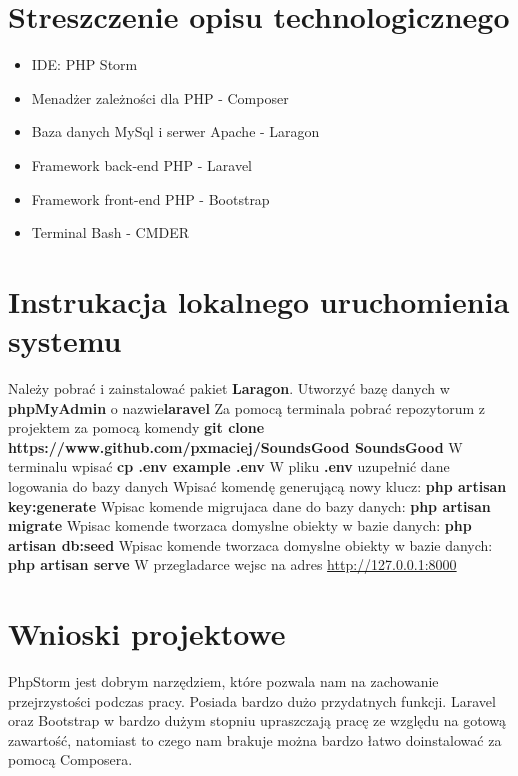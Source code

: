 \documentclass[11pt,a4paper]{article}
\begin{document}
\section{Streszczenie opisu technologicznego}
\begin{itemize}
\item IDE: PHP Storm
\item Menadżer zależności dla PHP - Composer
\item Baza danych MySql i serwer Apache - Laragon
\item Framework back-end PHP - Laravel
\item Framework front-end PHP - Bootstrap
\item Terminal Bash - CMDER
\end{itemize}
\section{Instrukacja lokalnego uruchomienia systemu}
Należy pobrać i zainstalować pakiet \textbf {Laragon}.
\newline
Utworzyć bazę danych w \textbf {phpMyAdmin} o nazwie\textbf {laravel}
\newline
Za pomocą terminala pobrać repozytorum z projektem za pomocą komendy
\newline
\textbf{git clone https://www.github.com/pxmaciej/SoundsGood SoundsGood}
\newline
W terminalu wpisać \textbf  {cp .env example .env}
\newline
W pliku \textbf{.env} uzupełnić dane logowania do bazy danych
\newline
Wpisać komendę generującą nowy klucz: \textbf {php artisan key:generate}
\newline
Wpisac komende migrujaca dane do bazy danych: \textbf {php artisan migrate}
\newline
Wpisac komende tworzaca domyslne obiekty w bazie danych: \textbf {php artisan db:seed}
\newline
Wpisac komende tworzaca domyslne obiekty w bazie danych: \textbf {php artisan serve}
\newline
W przegladarce wejsc na adres \href {http://127.0.0.1:8000} {http://127.0.0.1:8000}
\section{Wnioski projektowe}
PhpStorm jest dobrym narzędziem, które pozwala nam na zachowanie przejrzystości podczas pracy. Posiada bardzo dużo przydatnych funkcji.
Laravel oraz Bootstrap w bardzo dużym stopniu upraszczają pracę ze względu na gotową zawartość, natomiast to czego nam brakuje można bardzo
łatwo doinstalować za pomocą Composera.
\end{document}
